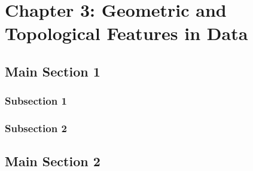 
\chapter{Chapter 3: Geometric and Topological Features in Data} %

\label{Chapter3} %


\section{Main Section 1}


\subsection{Subsection 1}



\subsection{Subsection 2}



\section{Main Section 2}
